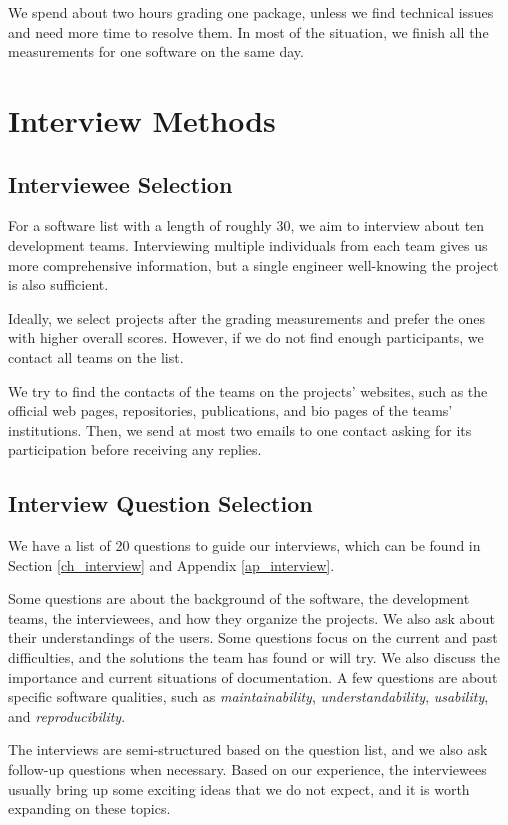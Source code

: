 We spend about two hours grading one package, unless we find technical issues and need more time to resolve them. In most of the situation, we finish all the measurements for one software on the same day.

\section{Interview Methods}
\label{sec_interview_methods}

\subsection{Interviewee Selection}
For a software list with a length of roughly 30, we aim to interview about ten development teams. Interviewing multiple individuals from each team gives us more comprehensive information, but a single engineer well-knowing the project is also sufficient.

Ideally, we select projects after the grading measurements and prefer the ones with higher overall scores. However, if we do not find enough participants, we contact all teams on the list.

We try to find the contacts of the teams on the projects' websites, such as the official web pages, repositories, publications, and bio pages of the teams' institutions. Then, we send at most two emails to one contact asking for its participation before receiving any replies.

\subsection{Interview Question Selection}

We have a list of 20 questions to guide our interviews, which can be found in Section \ref{ch_interview} and Appendix \ref{ap_interview}.

Some questions are about the background of the software, the development teams, the interviewees, and how they organize the projects. We also ask about their understandings of the users. Some questions focus on the current and past difficulties, and the solutions the team has found or will try. We also discuss the importance and current situations of documentation. A few questions are about specific software qualities, such as \textit{maintainability}, \textit{understandability}, \textit{usability}, and \textit{reproducibility}.

The interviews are semi-structured based on the question list, and we also ask follow-up questions when necessary. Based on our experience, the interviewees usually bring up some exciting ideas that we do not expect, and it is worth expanding on these topics.

